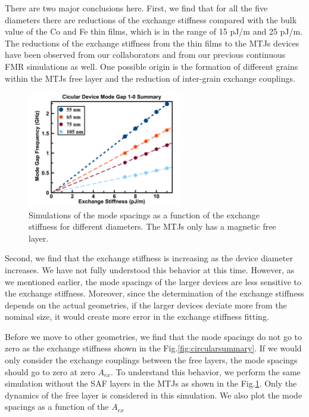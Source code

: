 There are two major conclusions here. First, we find that for all the five diameters there are reductions of the exchange stiffness compared with the bulk value of the Co and Fe thin films, which is in the range of 15 pJ/m and 25 pJ/m. The reductions of the exchange stiffness from the thin films to the MTJs devices have been observed from our collaborators and from our previous continuous FMR simulations as well. One possible origin is the formation of different grains within the MTJs free layer and the reduction of inter-grain exchange couplings.


\begin{figure}[!ht]
  \centering
  \includegraphics[width=0.6\textwidth]{fig/2018/sim/free_only_circular}
   \caption{Simulations of the mode spacings as a function of the exchange stiffness for different diameters. The MTJs only has a magnetic free layer.}
  \label{fig:freecircularsummary}
\end{figure}

Second, we find that the exchange stiffness is increasing as the device diameter increases. We have not fully understood this behavior at this time. However, as we mentioned earlier, the mode spacings of the larger devices are less sensitive to the exchange stiffness. Moreover, since the determination of the exchange stiffness depends on the actual geometries, if the larger devices deviate more from the nominal size, it would create more error in the exchange stiffness fitting.

Before we move to other geometries, we find that the mode spacings do not go to zero as the exchange stiffness shown in the Fig.\ref{fig:circularsummary}. If we would only consider the exchange couplings between the free layers, the mode spacings should go to zero at zero $A_{ex}$. To understand this behavior, we perform the same simulation without the SAF layers in the MTJs as shown in the Fig.\ref{fig:freecircularsummary}. Only the dynamics of the free layer is considered in this simulation. We also plot the mode spacings as a function of the $A_{ex}$

